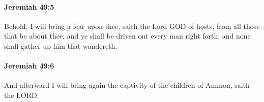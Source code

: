 		\paragraph{Jeremiah 49:5} %
			\label{JEREMIAH-49-5}

			Behold, I will bring a fear upon thee, saith the Lord GOD of hosts, from all those that be about thee; and ye shall be driven out every man right forth; and none shall gather up him that wandereth.


		\paragraph{Jeremiah 49:6} %
			\label{JEREMIAH-49-6}

			And afterward I will bring again the captivity of the children of Ammon, saith the LORD.


